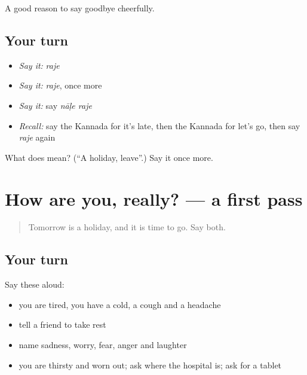 \begin{grammarlens}[title={What you've built}]
A good reason to say goodbye cheerfully.
\end{grammarlens}

\subsection*{Your turn}
\begin{itemize}
\raggedright
  \item \emph{Say it:} \emph{raje}
  \item \emph{Say it:} \emph{raje}, once more
  \item \emph{Say it:} say \emph{nāḷe raje}
  \item \emph{Recall:} say the Kannada for it's late, then the Kannada for let's go, then say \emph{raje} again
\end{itemize}

\begin{tcolorbox}[breakable,colback=teal!4,colframe=teal!35!black,title={Before you move on}]
What does  mean? (\textquotedblleft{}A holiday, leave\textquotedblright{}.) Say it once more.
\end{tcolorbox}
\section[(dialogue)]{How are you, really? — a first pass}

\label{lesson:KA-R89-first-pass-unwell-feelings}



\begin{quote}
Tomorrow is a holiday, and it is time to go. Say both.
\end{quote}

\subsection*{Your turn}
Say these aloud:

\begin{itemize}
\raggedright
  \item you are tired, you have a cold, a cough and a headache
  \item tell a friend to take rest
  \item name sadness, worry, fear, anger and laughter
  \item you are thirsty and worn out; ask where the hospital is; ask for a tablet
\end{itemize}

